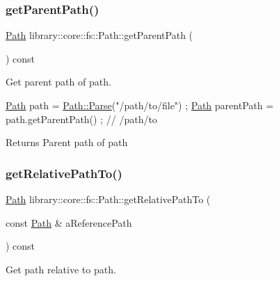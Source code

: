 \subsubsection{\texorpdfstring{get\+Parent\+Path()}{getParentPath()}}
{\footnotesize\ttfamily \hyperlink{classlibrary_1_1core_1_1fs_1_1_path}{Path} library\+::core\+::fs\+::\+Path\+::get\+Parent\+Path (\begin{DoxyParamCaption}{ }\end{DoxyParamCaption}) const}



Get parent path of path. 


\begin{DoxyCode}
\hyperlink{classlibrary_1_1core_1_1fs_1_1_path_aabc4240fc08479d1bff6b9753f2b5cc2}{Path} path = \hyperlink{classlibrary_1_1core_1_1fs_1_1_path_a6ba644b6609507e724c217bf2020f5ae}{Path::Parse}(\textcolor{stringliteral}{"/path/to/file"}) ;
\hyperlink{classlibrary_1_1core_1_1fs_1_1_path_aabc4240fc08479d1bff6b9753f2b5cc2}{Path} parentPath = path.getParentPath() ; \textcolor{comment}{// /path/to}
\end{DoxyCode}


\begin{DoxyReturn}{Returns}
Parent path of path 
\end{DoxyReturn}
\mbox{\label{classlibrary_1_1core_1_1fs_1_1_path_a8f24340e887cfbfe675e96c0ba92321f}} 
\subsubsection{\texorpdfstring{get\+Relative\+Path\+To()}{getRelativePathTo()}}
{\footnotesize\ttfamily \hyperlink{classlibrary_1_1core_1_1fs_1_1_path}{Path} library\+::core\+::fs\+::\+Path\+::get\+Relative\+Path\+To (\begin{DoxyParamCaption}\item[{const \hyperlink{classlibrary_1_1core_1_1fs_1_1_path}{Path} \&}]{a\+Reference\+Path }\end{DoxyParamCaption}) const}



Get path relative to path. 


